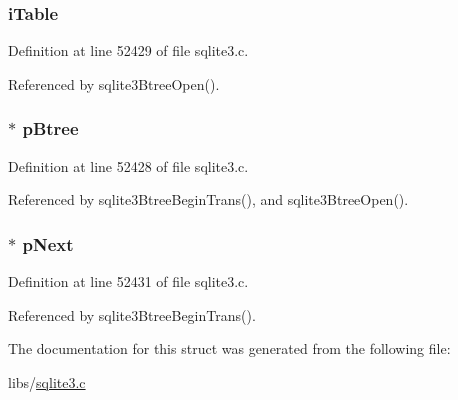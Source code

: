 \hypertarget{struct_bt_lock_a3fcabb855c7cc0012054edd0e5b4f563}{}
\subsubsection[{i\+Table}]{ i\+Table}\label{struct_bt_lock_a3fcabb855c7cc0012054edd0e5b4f563}


Definition at line 52429 of file sqlite3.\+c.



Referenced by sqlite3\+Btree\+Open().

\hypertarget{struct_bt_lock_a8bc098d3190d7b0458b0f00fc3e9841b}{}
\subsubsection[{p\+Btree}]{$\ast$ p\+Btree}\label{struct_bt_lock_a8bc098d3190d7b0458b0f00fc3e9841b}


Definition at line 52428 of file sqlite3.\+c.



Referenced by sqlite3\+Btree\+Begin\+Trans(), and sqlite3\+Btree\+Open().

\hypertarget{struct_bt_lock_afb07c44543b64b4979cb4d58c98e7cad}{}
\subsubsection[{p\+Next}]{$\ast$ p\+Next}\label{struct_bt_lock_afb07c44543b64b4979cb4d58c98e7cad}


Definition at line 52431 of file sqlite3.\+c.



Referenced by sqlite3\+Btree\+Begin\+Trans().



The documentation for this struct was generated from the following file\+:\begin{DoxyCompactItemize}
\item 
libs/\hyperlink{sqlite3_8c}{sqlite3.\+c}\end{DoxyCompactItemize}
